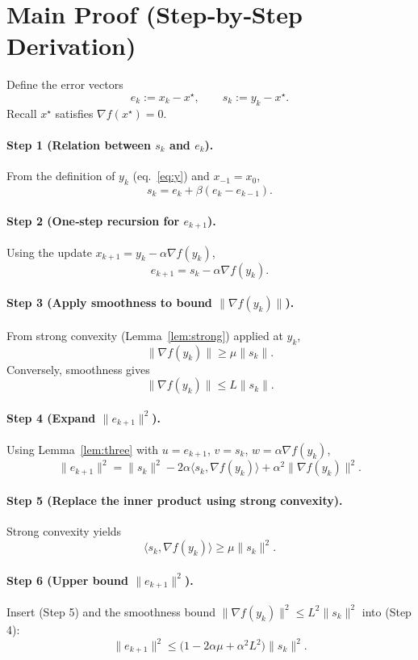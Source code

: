 \documentclass{article}
\begin{document}
\section*{Main Proof (Step‑by‑Step Derivation)}
Define the error vectors
\[
e_k := x_k - x^\star,\qquad s_k := y_k - x^\star .
\]
Recall $x^\star$ satisfies $\nabla f(x^\star)=0$.

\paragraph{Step 1 (Relation between $s_k$ and $e_k$).}
From the definition of $y_k$ (eq.~\eqref{eq:y}) and $x_{-1}=x_0$,
\[
s_k = e_k + \beta (e_k-e_{k-1}). \tag{Step 1}
\]

\paragraph{Step 2 (One‑step recursion for $e_{k+1}$).}
Using the update $x_{k+1}=y_k-\alpha\nabla f(y_k)$,
\[
e_{k+1}= s_k - \alpha\nabla f(y_k). \tag{Step 2}
\]

\paragraph{Step 3 (Apply smoothness to bound $\|\nabla f(y_k)\|$).}
From strong convexity (Lemma~\ref{lem:strong}) applied at $y_k$,
\[
\|\nabla f(y_k)\| \ge \mu \|s_k\| . \tag{Step 3}
\]
Conversely, smoothness gives
\[
\|\nabla f(y_k)\| \le L\|s_k\| . \tag{Step 3$'$}
\]

\paragraph{Step 4 (Expand $\|e_{k+1}\|^2$).}
Using Lemma~\ref{lem:three} with $u=e_{k+1}$, $v=s_k$, $w=\alpha\nabla f(y_k)$,
\[
\|e_{k+1}\|^2 = \|s_k\|^2 -2\alpha\langle s_k,\nabla f(y_k)\rangle
               +\alpha^2\|\nabla f(y_k)\|^2 . \tag{Step 4}
\]

\paragraph{Step 5 (Replace the inner product using strong convexity).}
Strong convexity yields
\[
\langle s_k,\nabla f(y_k)\rangle \ge \mu\|s_k\|^2 . \tag{Step 5}
\]

\paragraph{Step 6 (Upper bound $\|e_{k+1}\|^2$).}
Insert (Step 5) and the smoothness bound $\|\nabla f(y_k)\|^2\le L^2\|s_k\|^2$
into (Step 4):
\[
\|e_{k+1}\|^2 \le \bigl(1-2\alpha\mu+\alpha^2 L^2\bigr)\|s_k\|^2 .
\tag{Step 6}
\]
\end{document}
